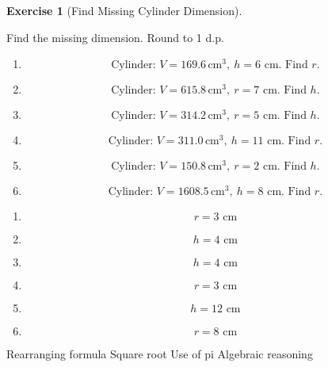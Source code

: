 \documentclass[
  letterpaper,
  DIV=11,
  numbers=noendperiod]{scrreprt}
\theoremstyle{definition}
\newtheorem{exercise}{Exercise}[chapter]
\theoremstyle{remark}
\begin{document}
\begin{exercise}[Find Missing Cylinder
Dimension]\protect\hypertarget{exr-comp-8}{}\label{exr-comp-8}

Find the missing dimension. Round to 1 d.p.

\begin{enumerate}
\def\labelenumi{\alph{enumi})}
\item
  \[\text{Cylinder: }V=169.6\,\text{cm}^{3},\ h=6\text{ cm. Find }r.\]
\item
  \[\text{Cylinder: }V=615.8\,\text{cm}^{3},\ r=7\text{ cm. Find }h.\]
\item
  \[\text{Cylinder: }V=314.2\,\text{cm}^{3},\ r=5\text{ cm. Find }h.\]
\item
  \[\text{Cylinder: }V=311.0\,\text{cm}^{3},\ h=11\text{ cm. Find }r.\]
\item
  \[\text{Cylinder: }V=150.8\,\text{cm}^{3},\ r=2\text{ cm. Find }h.\]
\item
  \[\text{Cylinder: }V=1608.5\,\text{cm}^{3},\ h=8\text{ cm. Find }r.\]
\end{enumerate}

\begin{tcolorbox}[enhanced jigsaw, opacitybacktitle=0.6, coltitle=black, arc=.35mm, colframe=quarto-callout-tip-color-frame, colback=white, bottomrule=.15mm, left=2mm, colbacktitle=quarto-callout-tip-color!10!white, titlerule=0mm, opacityback=0, title=\textcolor{quarto-callout-tip-color}{\faLightbulb}\hspace{0.5em}{🔍 View Solution}, leftrule=.75mm, breakable, rightrule=.15mm, bottomtitle=1mm, toptitle=1mm, toprule=.15mm]

\begin{enumerate}
\def\labelenumi{\alph{enumi})}
\item
  \[r=3\text{ cm}\]
\item
  \[h=4\text{ cm}\]
\item
  \[h=4\text{ cm}\]
\item
  \[r=3\text{ cm}\]
\item
  \[h=12\text{ cm}\]
\item
  \[r=8\text{ cm}\]
\end{enumerate}

\end{tcolorbox}

{Rearranging formula} {Square root} {Use of pi} {Algebraic reasoning}

\end{exercise}
\end{document}
